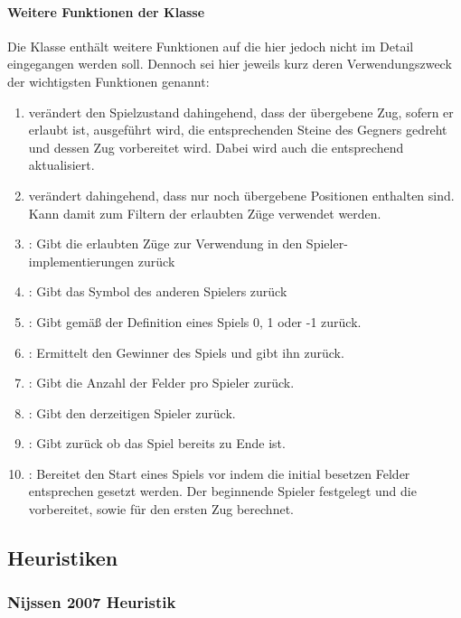 \paragraph{Weitere Funktionen der Klasse }
Die Klasse  enthält weitere Funktionen auf die hier jedoch nicht im Detail eingegangen werden soll. Dennoch sei hier jeweils kurz deren Verwendungszweck der wichtigsten Funktionen genannt:
\begin{enumerate}
\item {} verändert den Spielzustand dahingehend, dass der übergebene Zug, sofern er erlaubt ist, ausgeführt wird, die entsprechenden Steine des Gegners gedreht und dessen Zug vorbereitet wird. Dabei wird auch die  entsprechend aktualisiert.
\item {} verändert  dahingehend, dass nur noch übergebene Positionen enthalten sind. Kann damit zum Filtern der erlaubten Züge verwendet werden.
\item {}: Gibt die erlaubten Züge zur Verwendung in den Spieler-\\implementierungen zurück
\item {}: Gibt das Symbol des anderen Spielers zurück
\item {}: Gibt gemäß der Definition eines Spiels 0, 1 oder -1 zurück.
\item {}: Ermittelt den Gewinner des Spiels und gibt ihn zurück.
\item {}: Gibt die Anzahl der Felder pro Spieler zurück.
\item {}: Gibt den derzeitigen Spieler zurück.
\item {}: Gibt zurück ob das Spiel bereits zu Ende ist.
\item {}: Bereitet den Start eines Spiels vor indem die initial besetzen Felder entsprechen gesetzt werden. Der beginnende Spieler festgelegt und die   vorbereitet, sowie  für den ersten Zug berechnet.
\end{enumerate}
\subsection{Heuristiken}
\subsubsection{Nijssen 2007 Heuristik}
